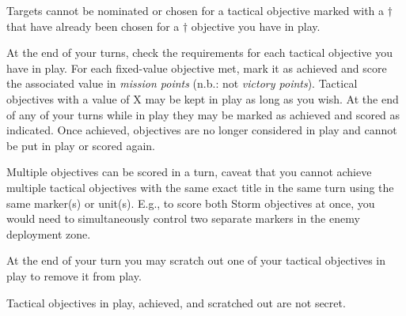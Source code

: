 \begin{missionrules}
Targets cannot be nominated or chosen for a tactical objective marked
with a $\dagger$ that have already been chosen for a $\dagger$
objective you have in play.

\smallskip%
At the end of your turns, check the requirements for each tactical
objective you have in play.  For each fixed-value objective met, mark
it as achieved and score the associated value in \emph{mission points}
(n.b.: not \emph{victory points}).  Tactical objectives with a value
of X may be kept in play as long as you wish.  At the end of any of
your turns while in play they may be marked as achieved and scored as
indicated.  Once achieved, objectives are no longer considered in play
and cannot be put in play or scored again.

Multiple objectives can be scored in a turn, caveat that you cannot
achieve multiple tactical objectives with the same exact title in the
same turn using the same marker(s) or unit(s).  E.g., to score both
Storm objectives at once, you would need to simultaneously control two
separate markers in the enemy deployment zone.

At the end of your turn you may scratch out one of your tactical
objectives in play to remove it from play.

\smallskip%
Tactical objectives in play, achieved, and scratched out are not
secret.

\end{missionrules}


\begin{scoring}
  

\begin{secondaries}
  \breaktheirback

  \holdthefield

  \assassination
\end{secondaries}

\end{scoring}
